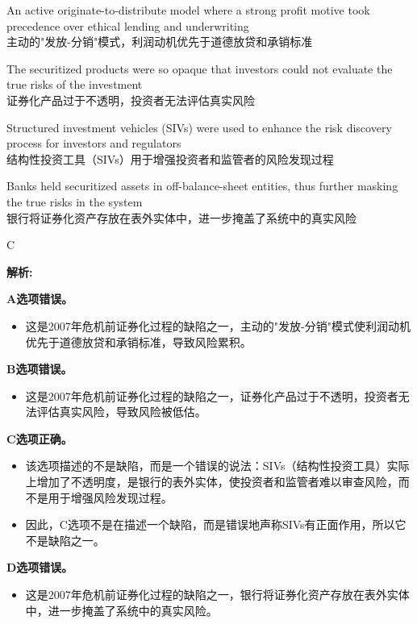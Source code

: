 \documentclass{article}
\newenvironment{explanation}
{\textbf{解析:}\par}
{\par}
\begin{document}
\begin{choices}
    \item An active originate-to-distribute model where a strong profit motive took precedence over ethical lending and underwriting\\
    主动的"发放-分销"模式，利润动机优先于道德放贷和承销标准
    \item The securitized products were so opaque that investors could not evaluate the true risks of the investment\\
    证券化产品过于不透明，投资者无法评估真实风险
    \item Structured investment vehicles (SIVs) were used to enhance the risk discovery process for investors and regulators\\
    结构性投资工具（SIVs）用于增强投资者和监管者的风险发现过程
    \item Banks held securitized assets in off-balance-sheet entities, thus further masking the true risks in the system\\
    银行将证券化资产存放在表外实体中，进一步掩盖了系统中的真实风险
\end{choices}

\begin{correctanswer}
    C
\end{correctanswer}

\begin{explanation}
    \textbf{A选项错误。}
    \begin{itemize}
        \item 这是2007年危机前证券化过程的缺陷之一，主动的"发放-分销"模式使利润动机优先于道德放贷和承销标准，导致风险累积。
    \end{itemize}

    \textbf{B选项错误。}
    \begin{itemize}
        \item 这是2007年危机前证券化过程的缺陷之一，证券化产品过于不透明，投资者无法评估真实风险，导致风险被低估。
    \end{itemize}

    \textbf{C选项正确。}
    \begin{itemize}
        \item 该选项描述的不是缺陷，而是一个错误的说法：SIVs（结构性投资工具）实际上增加了不透明度，是银行的表外实体，使投资者和监管者难以审查风险，而不是用于增强风险发现过程。
        \item 因此，C选项不是在描述一个缺陷，而是错误地声称SIVs有正面作用，所以它不是缺陷之一。
    \end{itemize}

    \textbf{D选项错误。}
    \begin{itemize}
        \item 这是2007年危机前证券化过程的缺陷之一，银行将证券化资产存放在表外实体中，进一步掩盖了系统中的真实风险。
    \end{itemize}
\end{explanation}
\end{document}

